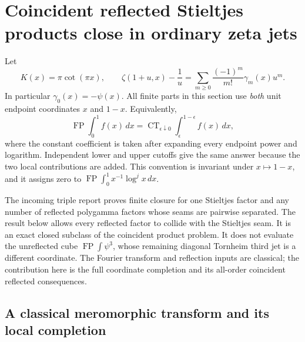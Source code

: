 \section{Coincident reflected Stieltjes products close in ordinary zeta jets}
\label{ct:section}

Let
\[
 K(x)=\pi\cot(\pi x),\qquad
 \zeta(1+u,x)-\frac1u
   =\sum_{m\ge0}\frac{(-1)^m}{m!}\gamma_m(x)u^m.
\]
In particular $\gamma_0(x)=-\psi(x)$. All finite parts in this section use
\emph{both} unit endpoint coordinates $x$ and $1-x$. Equivalently,
\[
 \operatorname{FP}\int_0^1 f(x)\,dx
 =\operatorname{CT}_{\epsilon\downarrow0}
       \int_\epsilon^{1-\epsilon} f(x)\,dx,
\]
where the constant coefficient is taken after expanding every endpoint
power and logarithm. Independent lower and upper cutoffs give the same
answer because the two local contributions are added. This convention
is invariant under $x\mapsto1-x$, and it assigns zero to
$\operatorname{FP}\int_0^1x^{-1}\log^j x\,dx$.

The incoming triple report proves finite closure for one Stieltjes factor
\cite{RepoTriple} and any number of reflected polygamma factors whose seams are pairwise
separated. The result below allows every reflected factor to collide with
the Stieltjes seam. It is an exact closed subclass of the coincident
product problem. It does not evaluate the unreflected cube
$\operatorname{FP}\int\psi^3$, whose remaining diagonal Tornheim third
jet is a different coordinate. The Fourier transform and reflection
inputs are classical; the contribution here is the full coordinate
completion and its all-order coincident reflected consequences.

\subsection{A classical meromorphic transform and its local completion}

